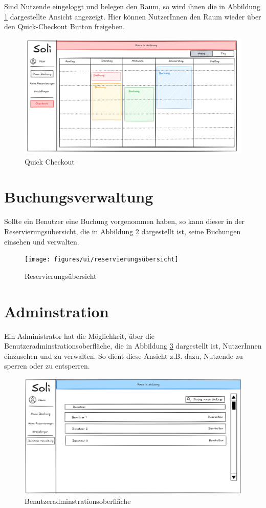 Sind Nutzende eingeloggt und belegen den Raum,
so wird ihnen die in Abbildung \ref{fig:checkout} dargestellte Ansicht angezeigt.
Hier können NutzerInnen den Raum wieder über den Quick-Checkout Button freigeben.
\begin{figure}[ht]
    \centering
    \includegraphics[scale=0.15]{figures/ui/checkout}
    \caption{Quick Checkout}
    \label{fig:checkout}
\end{figure}
\clearpage

\section{Buchungsverwaltung}
Sollte ein Benutzer eine Buchung vorgenommen haben, so kann dieser in der Reservierungsübersicht,
die in Abbildung \ref{fig:overview} dargestellt ist, seine Buchungen einsehen und verwalten.

\begin{figure}[ht]
    \texttt{[image: figures/ui/reservierungsübersicht]}
    \caption{Reservierungsübersicht}
    \label{fig:overview}
\end{figure}
\clearpage

\section{Adminstration}
Ein Administrator hat die Möglichkeit, über die Benutzeradminstrationsoberfläche,
die in Abbildung \ref{fig:adminuser} dargestellt ist, NutzerInnen einzusehen und zu verwalten.
So dient diese Ansicht z.B. dazu, Nutzende zu sperren oder zu entsperren.

\begin{figure}[ht]
    \centering
    \includegraphics[scale=0.15]{figures/ui/useradminui}
    \caption{Benutzeradminstrationsoberfläche}
    \label{fig:adminuser}
\end{figure}


